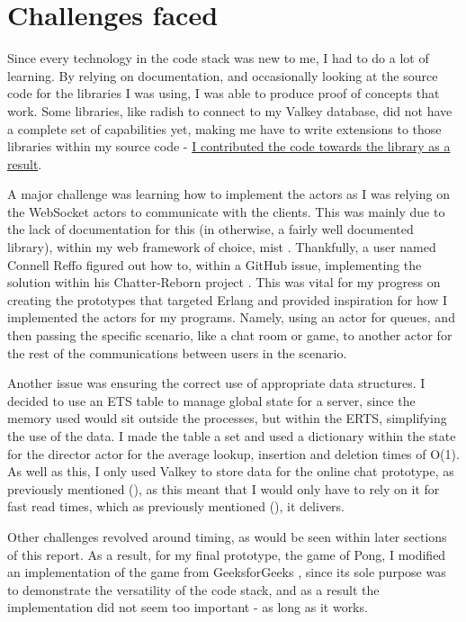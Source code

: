\documentclass[]{final}
\begin{document}
\section{Challenges faced}

Since every technology in the code stack was new to me, I had to do a lot of learning.
By relying on documentation, and occasionally looking at the source code for
the libraries I was using, I was able to produce proof of concepts that work.
Some libraries, like radish to connect to my Valkey database, did not have
a complete set of capabilities yet, making me have to write extensions to those
libraries within my source code - \href{https://github.com/massivefermion/radish/pull/7}{I contributed the code towards the library as a result}.

A major challenge was learning how to implement the actors as I was relying on
the WebSocket actors to communicate with the clients. This was mainly due to the
lack of documentation for this (in otherwise, a fairly well documented library),
within my web framework of choice, mist \cite{noauthor_example_nodate}.
Thankfully, a user named Connell Reffo figured out how to, within a GitHub issue,
implementing the solution within his Chatter-Reborn project \cite{reffo_connellr023/chatter-reborn_2024}.
This was vital for my progress on creating the prototypes that targeted Erlang and
provided inspiration for how I implemented the actors for my programs. Namely,
using an actor for queues, and then passing the specific scenario, like a chat
room or game, to another actor for the rest of the communications
between users in the scenario.

Another issue was ensuring the correct use of appropriate data structures.
I decided to use an ETS table to manage global state for a server, since the
memory used would sit outside the processes, but within the ERTS, simplifying
the use of the data. I made the table a set and used a dictionary within the
state for the director actor for the average lookup, insertion and deletion
times of O(1). As well as this, I only used Valkey to store data for the
online chat prototype, as previously mentioned {\hypersetup{linkcolor=teal}(\pageref{valkeyMessageBroker})}, as this meant that I would
only have to rely on it for fast read times, which as previously mentioned {\hypersetup{linkcolor=teal}(\pageref{valkeyRead})},
it delivers.

Other challenges revolved around timing, as would be seen within later sections
of this report. As a result, for my final prototype, the game of Pong, I
modified an implementation of the game from GeeksforGeeks \cite{GeeksforGeeks_pong_2021}, since its sole
purpose was to demonstrate the versatility of the code stack, and as a result
the implementation did not seem too important - as long as it works.
\end{document}
